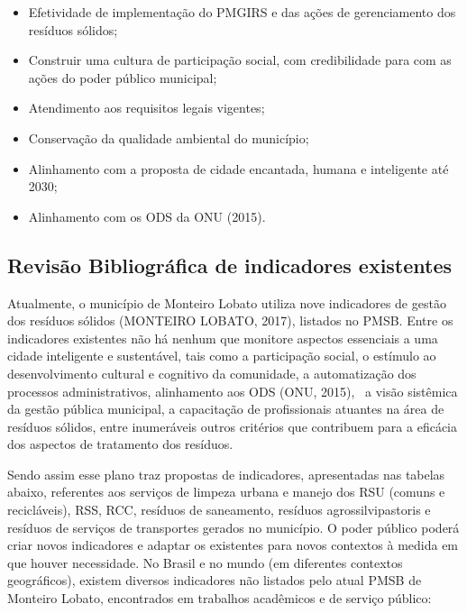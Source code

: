 	\begin{itemize}
		\item Efetividade de implementação do PMGIRS e das ações de gerenciamento dos resíduos sólidos;
		\item Construir uma cultura de participação social, com credibilidade para com as ações do poder público municipal;
		\item Atendimento aos requisitos legais vigentes;
		\item Conservação da qualidade ambiental do município;
		\item Alinhamento com a proposta de cidade encantada, humana e inteligente até 2030;
		\item Alinhamento com os ODS da ONU (2015).
	\end{itemize}
	
	\subsection{Revisão Bibliográfica de indicadores existentes }
	
	Atualmente, o município de Monteiro Lobato utiliza nove indicadores de gestão dos resíduos sólidos (MONTEIRO LOBATO, 2017), listados no PMSB.
	Entre os indicadores existentes não há nenhum que monitore aspectos essenciais a uma cidade inteligente e sustentável, tais como a participação social, o estímulo ao desenvolvimento cultural e cognitivo da comunidade, a automatização dos processos administrativos, alinhamento aos ODS (ONU, 2015),  a visão sistêmica da gestão pública municipal, a capacitação de profissionais atuantes na área de resíduos sólidos, entre inumeráveis outros critérios que contribuem para a eficácia dos aspectos de tratamento dos resíduos.
	
	Sendo assim esse plano traz propostas de indicadores, apresentadas nas tabelas abaixo, referentes aos serviços de limpeza urbana e manejo dos RSU (comuns e recicláveis), RSS, RCC, resíduos de saneamento, resíduos agrossilvipastoris e resíduos de serviços de transportes gerados no município. O poder público poderá criar novos indicadores e adaptar os existentes para novos contextos à medida em que houver necessidade.
	No Brasil e no mundo (em diferentes contextos geográficos), existem diversos indicadores não listados pelo atual PMSB de Monteiro Lobato, encontrados em trabalhos acadêmicos e de serviço público:
	
